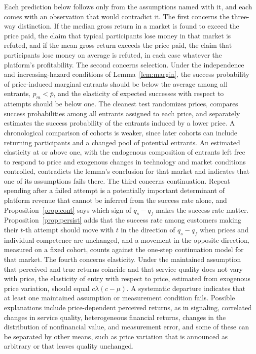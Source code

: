 \documentclass[11pt]{article}
\theoremstyle{remark}
\begin{document}
Each prediction below follows only from the assumptions named with it, and each comes with an observation that would contradict it. The first concerns the three-way distinction. If the median gross return in a market is found to exceed the price paid, the claim that typical participants lose money in that market is refuted, and if the mean gross return exceeds the price paid, the claim that participants lose money on average is refuted, in each case whatever the platform's profitability. The second concerns selection. Under the independence and increasing-hazard conditions of Lemma~\ref{lem:margin}, the success probability of price-induced marginal entrants should be below the average among all entrants, $p_m<\bar p$, and the elasticity of expected successes with respect to attempts should be below one. The cleanest test randomizes prices, compares success probabilities among all entrants assigned to each price, and separately estimates the success probability of the entrants induced by a lower price. A chronological comparison of cohorts is weaker, since later cohorts can include returning participants and a changed pool of potential entrants. An estimated elasticity at or above one, with the endogenous composition of entrants left free to respond to price and exogenous changes in technology and market conditions controlled, contradicts the lemma's conclusion for that market and indicates that one of its assumptions fails there. The third concerns continuation. Repeat spending after a failed attempt is a potentially important determinant of platform revenue that cannot be inferred from the success rate alone, and Proposition~\ref{prop:cont} says which sign of $q_s-q_f$ makes the success rate matter. Proposition~\ref{prop:persist} adds that the success rate among customers making their $t$-th attempt should move with $t$ in the direction of $q_s-q_f$ when prices and individual competence are unchanged, and a movement in the opposite direction, measured on a fixed cohort, counts against the one-step continuation model for that market. The fourth concerns elasticity. Under the maintained assumption that perceived and true returns coincide and that service quality does not vary with price, the elasticity of entry with respect to price, estimated from exogenous price variation, should equal $c\lambda(c-\mu)$. A systematic departure indicates that at least one maintained assumption or measurement condition fails. Possible explanations include price-dependent perceived returns, as in signaling, correlated changes in service quality, heterogeneous financial returns, changes in the distribution of nonfinancial value, and measurement error, and some of these can be separated by other means, such as price variation that is announced as arbitrary or that leaves quality unchanged.
\end{document}
